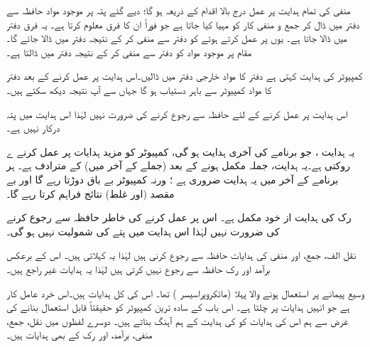منفی کی  تمام ہدایت  پر عمل درج بالا اقدام کے ذریعہ ہو گا؛ دیے گئے پتہ پر موجود مواد حافظہ سے دفتر   میں ڈال کر جمع و منفی کار کو مہیا کیا جاتا ہے جو فوراً ان کا فرق معلوم کرتا ہے۔ یہ فرق دفتر  میں ڈالا جاتا ہے۔ یوں  پر عمل کرتے ہوئے  کو دفتر  سے منفی کر کے نتیجہ دفتر  میں ڈالا جائے گا۔  مقام   پر موجود مواد  کو دفتر  سے منفی کر کے نتیجہ دفتر  میں ڈالتا ہے۔

کمپیوٹر کی ہدایت    کہتی ہے دفتر  کا مواد خارجی دفتر میں ڈالیں۔اس ہدایت پر عمل کرنے کے بعد دفتر  کا مواد کمپیوٹر سے باہر دستیاب ہو گا جہاں سے آپ نتیجہ دیکھ سکتے ہیں۔

اس ہدایت پر عمل کرنے کے لئے  حافظہ سے رجوع کرنے کی ضرورت نہیں لہٰذا اس ہدایت میں پتہ درکار نہیں ہے۔

یہ ہدایت  ، جو برنامے کی آخری ہدایت ہو گی، کمپیوٹر کو  مزید ہدایات پر عمل کرنے ے روکتی ہے۔یہ ہدایت،  جملہ مکمل ہونے کے بعد    (جملے کے آخر میں)  کے مترادف ہے۔ ہر برنامے کے آخر میں یہ ہدایت ضروری ہے ؛  ورنہ کمپیوٹر  بے باق   دوڑتا رہے گا  اور بے مقصد (اور غلط) نتائج فراہم کرتا رہے گا۔

رک کی ہدایت از خود مکمل ہے۔ اس پر عمل کرنے کی خاطر حافظہ سے رجوع کرنے کی ضرورت نہیں لہٰذا اس ہدایت میں پتے کی شمولیت نہیں ہو گی۔

نقل الف، جمع، اور منفی کی ہدایات حافظہ سے رجوع کرنی ہیں لہٰذا یہ کہلاتی ہیں۔ اس کے برعکس برآمد اور  رک حافظہ سے رجوع نہیں کرتی ہیں لہٰذا یہ ہدایات غیر راجع  ہیں۔

وسیع  پیمانے پر استعمال ہونے والا  پہلا  (مائکروپراسیسر )   تھا۔ اس کی کل  ہدایات ہیں۔اس خرد عامل کار  ہے  جو انہیں ہدایات پر چلتا ہے۔  اس باب کے  سادہ ترین کمپیوٹر کو حقیقتاً قابل استعمال بنانے کی غرض سے ہم  اس کی ہدایات کو  کی ہدایت کے  ہم آہنگ بناتے ہیں۔ دوسرے لفظوں میں  نقل، جمع، منفی، برآمد، اور رک  کے بھی ہدایات ہیں۔

